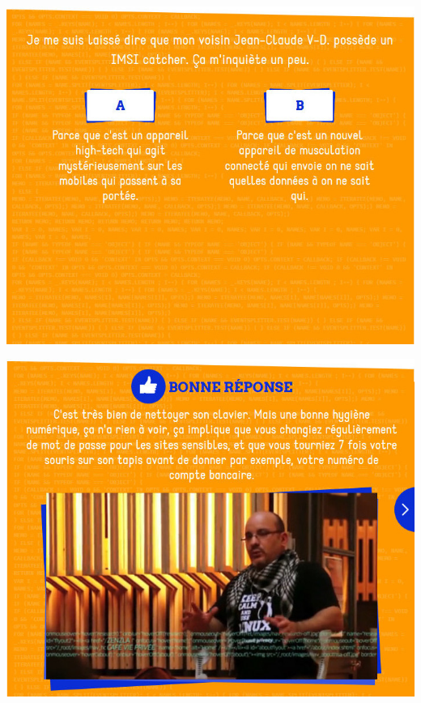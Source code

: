 \documentclass{beamer}
\begin{document}
\begin{frame}\includegraphics[scale=0.6] {./images/Quizz_HygieneNumerique_France4_6.jpg} \end{frame}
\begin{frame}\includegraphics[scale=0.6] {./images/Quizz_HygieneNumerique_France4_7.jpg} \end{frame}
\end{document}
